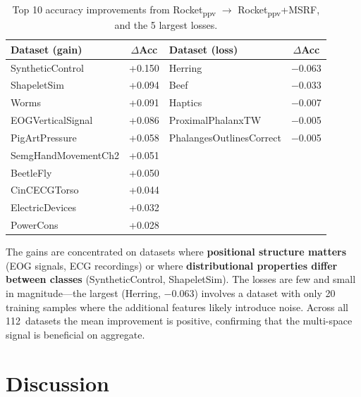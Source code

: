 \documentclass{article}
\begin{document}
\begin{table}[h]
  \caption{Top 10 accuracy improvements from Rocket\textsubscript{ppv} $\to$ Rocket\textsubscript{ppv}+MSRF, and the 5 largest losses.}
  \label{tab:top_improvements}
  \centering
  \small
  \begin{tabular}{@{}lclc@{}}
    \toprule
    Dataset (gain) & $\Delta$Acc & Dataset (loss) & $\Delta$Acc \\
    \midrule
    SyntheticControl     & +0.150 & Herring                    & $-$0.063 \\
    ShapeletSim          & +0.094 & Beef                       & $-$0.033 \\
    Worms                & +0.091 & Haptics                    & $-$0.007 \\
    EOGVerticalSignal    & +0.086 & ProximalPhalanxTW          & $-$0.005 \\
    PigArtPressure       & +0.058 & PhalangesOutlinesCorrect   & $-$0.005 \\
    SemgHandMovementCh2  & +0.051 & & \\
    BeetleFly            & +0.050 & & \\
    CinCECGTorso         & +0.044 & & \\
    ElectricDevices      & +0.032 & & \\
    PowerCons            & +0.028 & & \\
    \bottomrule
  \end{tabular}
\end{table}

The gains are concentrated on datasets where \textbf{positional structure matters} (EOG signals, ECG recordings) or where \textbf{distributional properties differ between classes} (SyntheticControl, ShapeletSim).
The losses are few and small in magnitude---the largest (Herring, $-$0.063) involves a dataset with only 20 training samples where the additional features likely introduce noise.
Across all 112~datasets the mean improvement is positive, confirming that the multi-space signal is beneficial on aggregate.


\section{Discussion}
\label{sec:discussion}
\end{document}
